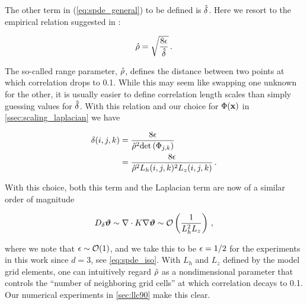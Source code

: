 The other term in (\cref{eq:spde_general}) to be defined is $\hat{\delta}$.
Here we resort to the empirical relation suggested in
\citet{RSSB:RSSB777}:
\begin{linenomath*}\begin{equation*}
    \hat{\rho} = \sqrt{\dfrac{8\epsilon}{\hat{\delta}}} \, .
\end{equation*}\end{linenomath*}
The so-called range parameter, $\hat{\rho}$, defines the
distance between two points at which correlation drops to 0.1.
While this may seem like swapping one unknown for the other, it is usually easier to
define correlation length scales than simply guessing values for $\hat{\delta}$.
With this relation and our choice for $\Phi(\mathbf{x})$ in
\cref{ssec:scaling_laplacian} we have
\begin{linenomath*}\begin{equation*}
    \begin{aligned}
        \delta(i,j,k) &= \dfrac{8\epsilon}{\hat{\rho}^2\text{det}\left(\Phi_{{j,k}}\right)} \\
                 &= \dfrac{8\epsilon}{\hat{\rho}^2 L_h(i,j,k)^2 L_z(i,j,k)} \, .
    \end{aligned}
\end{equation*}\end{linenomath*}
With this choice, both this term and the Laplacian term are now of a similar order of
magnitude
\begin{linenomath*}\begin{equation*}
    D_{\delta}\bm{\vartheta} \sim \nabla \cdot K \nabla \bm{\vartheta} \sim
    \mathcal{O}\left(\dfrac{1}{L_h^2 L_z}\right) \, ,
\end{equation*}\end{linenomath*}
where we note that $\epsilon \sim \mathcal{O}(1)$, and we take this to be
$\epsilon = 1/2$ for the experiments in this work since $d=3$, see
\cref{eq:spde_iso}.
With $L_h$ and $L_z$ defined by the model grid elements, one can intuitively
regard $\hat{\rho}$ as a nondimensional parameter that controls the
``number of neighboring grid cells'' at which correlation decays to 0.1.
Our numerical experiments in \cref{sec:llc90} make this clear.
